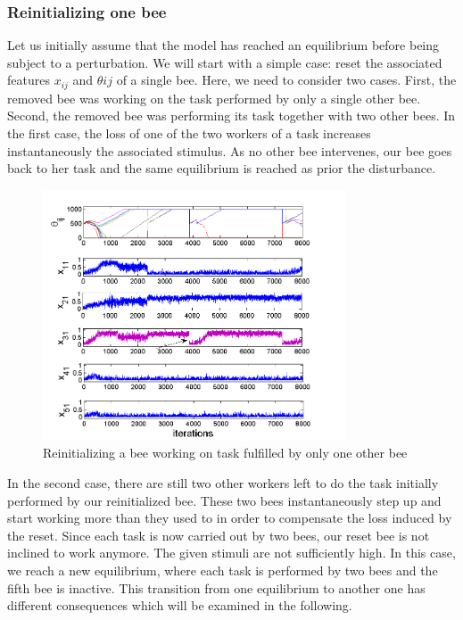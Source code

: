 \subsubsection{Reinitializing one bee}
Let us initially assume that the model has reached an equilibrium before being subject to a perturbation. We will start with a simple case: reset the associated features $x_{ij}$ and $\theta{ij}$ of a single bee. Here, we need to consider two cases. First, the removed bee was working on the task performed by only a single other bee. Second, the removed bee was performing its task together with two other bees. 
In the first case, the loss of one of the two workers of a task increases instantaneously the associated stimulus. As no other bee intervenes, our bee goes back to her task and the same equilibrium is reached as prior the disturbance. 

\begin{figure}[ht!]
	\centering
	\includegraphics[width=0.8\textwidth]{figures/figure1}
	\caption{Reinitializing a bee working on task fulfilled by only one other bee}
	\label{fig:figure1}
\end{figure}


In the second case, there are still two other workers left to do the task initially performed by our reinitialized bee. These two bees instantaneously step up and start working more than they used to in order to compensate the loss induced by the reset. Since each task is now carried out by two bees, our reset bee is not inclined to work anymore. The given stimuli are not sufficiently high. In this case, we reach a new equilibrium, where each task is performed by two bees and the fifth bee is inactive. This transition from one equilibrium to another one has different consequences which will be examined in the following.

